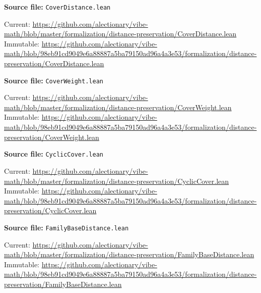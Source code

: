 \par\smallskip\noindent\begin{minipage}{\linewidth}\small\setlength{\baselineskip}{11pt}
\textbf{Source file:} \nolinkurl{CoverDistance.lean}\par\nopagebreak
Current: \url{https://github.com/alectionary/vibe-math/blob/master/formalization/distance-preservation/CoverDistance.lean}\\
Immutable: \url{https://github.com/alectionary/vibe-math/blob/98eb91cd9049e6a88887a5ba79150ad96a4a3e53/formalization/distance-preservation/CoverDistance.lean}\par\end{minipage}\par
\par\smallskip\noindent\begin{minipage}{\linewidth}\small\setlength{\baselineskip}{11pt}
\textbf{Source file:} \nolinkurl{CoverWeight.lean}\par\nopagebreak
Current: \url{https://github.com/alectionary/vibe-math/blob/master/formalization/distance-preservation/CoverWeight.lean}\\
Immutable: \url{https://github.com/alectionary/vibe-math/blob/98eb91cd9049e6a88887a5ba79150ad96a4a3e53/formalization/distance-preservation/CoverWeight.lean}\par\end{minipage}\par
\par\smallskip\noindent\begin{minipage}{\linewidth}\small\setlength{\baselineskip}{11pt}
\textbf{Source file:} \nolinkurl{CyclicCover.lean}\par\nopagebreak
Current: \url{https://github.com/alectionary/vibe-math/blob/master/formalization/distance-preservation/CyclicCover.lean}\\
Immutable: \url{https://github.com/alectionary/vibe-math/blob/98eb91cd9049e6a88887a5ba79150ad96a4a3e53/formalization/distance-preservation/CyclicCover.lean}\par\end{minipage}\par
\par\smallskip\noindent\begin{minipage}{\linewidth}\small\setlength{\baselineskip}{11pt}
\textbf{Source file:} \nolinkurl{FamilyBaseDistance.lean}\par\nopagebreak
Current: \url{https://github.com/alectionary/vibe-math/blob/master/formalization/distance-preservation/FamilyBaseDistance.lean}\\
Immutable: \url{https://github.com/alectionary/vibe-math/blob/98eb91cd9049e6a88887a5ba79150ad96a4a3e53/formalization/distance-preservation/FamilyBaseDistance.lean}\par\end{minipage}\par
